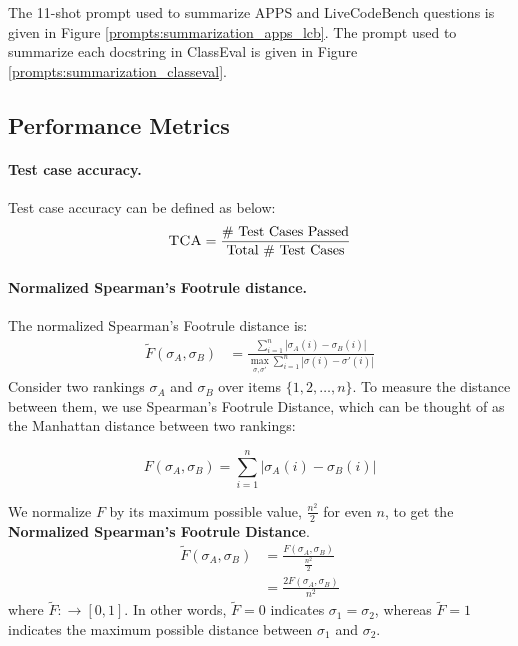 The 11-shot prompt used to summarize APPS and LiveCodeBench questions is given in Figure \ref{prompts:summarization_apps_lcb}.
The prompt used to summarize each docstring in ClassEval is given in Figure \ref{prompts:summarization_classeval}.















\subsection{Performance Metrics}
\label{app:performance_metrics}
\paragraph{Test case accuracy.}
Test case accuracy can be defined as below:
%
\begin{equation*}
    \textsc{TCA} = \frac{\text{\# Test Cases Passed}}{\text{Total \# Test Cases}}
\end{equation*}
\paragraph{Normalized Spearman's Footrule distance.}

The normalized Spearman's Footrule distance is:
%
\begin{align*}
    \tilde{F}(\sigma_A, \sigma_B) &= \frac{ \sum^n_{i=1} |\sigma_A(i) - \sigma_B(i)|}{\max_{\sigma, \sigma'}  \sum^n_{i=1} |\sigma(i) - \sigma'(i)|}
\end{align*}
%
Consider two rankings $\sigma_A$ and $\sigma_B$ over items $\{1, 2, \dots, n\}$. To measure the distance between them, we use Spearman's Footrule Distance, which can be thought of as the Manhattan distance between two rankings:

\begin{equation*}
    F(\sigma_A, \sigma_B) = \sum^n_{i=1} |\sigma_A(i) - \sigma_B(i)|
\end{equation*}

We normalize $F$ by its maximum possible value, $\frac{n^2}{2}$ for even $n$, to get the \textbf{Normalized Spearman's Footrule Distance}. 
%
\begin{align*}
    \tilde{F}(\sigma_A, \sigma_B) &= \frac{F(\sigma_A, \sigma_B)}{\frac{n^2}{2}} \\
    &= \frac{2F(\sigma_A, \sigma_B)}{n^2}
\end{align*}
%
where $\tilde{F}: \to [0, 1]$. In other words, $\tilde{F}=0$ indicates $\sigma_1 = \sigma_2$, whereas $\tilde{F}=1$ indicates the maximum possible distance between $\sigma_1$ and $\sigma_2$.

